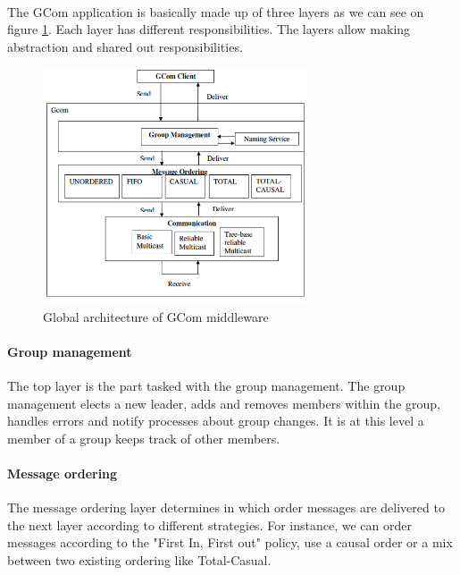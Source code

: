 
\paragraph{}{
	The GCom application is basically made up of three layers as
 we can see on figure \ref{fig:architecture}.
 Each layer has different responsibilities. The layers allow 
 making abstraction and shared out responsibilities.
}

\begin{figure}[!ht]
	\begin{center}
	\includegraphics[width=0.7\textwidth]{figures/gcom_architecture.png}
	\end{center}
	\caption{Global architecture of GCom middleware}
	\label{fig:architecture}
\end{figure}

\paragraph{Group management}{
	The top layer is the part tasked with the group management.
 The group management elects a new leader, adds and removes
 members within the group, handles errors and notify processes
 about group changes. It is at this level a member of a group keeps
 track of other members. }

\paragraph{Message ordering}{
	The message ordering layer determines in which order
 messages are delivered to the next layer according to different
 strategies. For instance, we can order messages according to the
 "First In, First out" policy, use a causal order or a mix
 between two existing ordering like Total-Casual.
}

